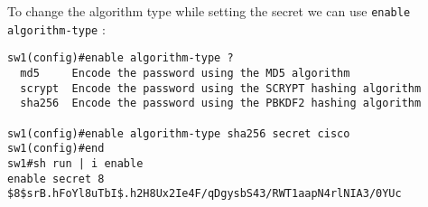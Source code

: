 \noindent
To change the algorithm type while setting the secret we can use \verb|enable algorithm-type| : 

\vspace{-15pt}
\begin{verbatim}
sw1(config)#enable algorithm-type ?
  md5     Encode the password using the MD5 algorithm
  scrypt  Encode the password using the SCRYPT hashing algorithm
  sha256  Encode the password using the PBKDF2 hashing algorithm

sw1(config)#enable algorithm-type sha256 secret cisco
sw1(config)#end
sw1#sh run | i enable
enable secret 8 $8$srB.hFoYl8uTbI$.h2H8Ux2Ie4F/qDgysbS43/RWT1aapN4rlNIA3/0YUc
\end{verbatim}
\vspace{-10pt}

